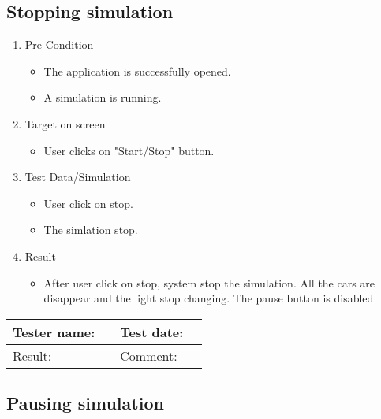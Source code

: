 \newpage

\subsection{Stopping  simulation}

\begin{enumerate}
	\item Pre-Condition
	\begin{itemize}
		\item The application is successfully opened.
		\item A simulation is running.
	\end{itemize}
	\item Target on screen
	\begin{itemize}
		\item User clicks on "Start/Stop" button.
	\end{itemize}
	\item Test Data/Simulation
	\begin{itemize}
		\item User click on stop.
		\item The simlation stop.
	\end{itemize}
	\item Result
	\begin{itemize}
		\item After user click on stop, system stop the simulation. All the cars are disappear and the light stop changing. The pause button is disabled
	\end{itemize}
\end{enumerate}

\begin{tabularx}{\textwidth}{|p{3cm}X|p{3cm}X|}\hline
	Tester name: &  & Test date: & \\\hline
	Result: &  \pass & Comment: & \\\hline
\end{tabularx}

\newpage

\subsection{Pausing  simulation}

